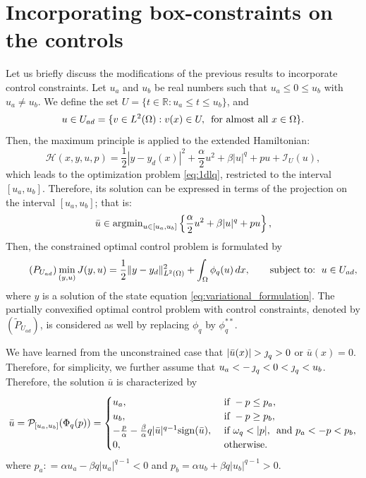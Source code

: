 	
\section{Incorporating box-constraints on the controls}
Let us briefly discuss the modifications of the previous results to incorporate control constraints. Let \(u_a\) and \(u_b\) be real numbers such that \(u_a \leq 0 \leq u_b\) with \(u_a \ne u_b\). We define the set \(U = \{t \in \mathbb{R} : u_a \leq t \leq u_b\}\),  and  
\begin{equation}\label{eq:Uad} 
	 u \in U_{ad}= \{ v \in L^2(\Omega): v(x) \in U, \, \text{ for almost all }x\in \Omega \}. 
\end{equation}
Then, the maximum principle is applied to the extended Hamiltonian:
\begin{equation} 
\mathcal H(x,y,u,p)= \frac{1}{2}|y-y_d(x)|^2 + \frac{\alpha}{2}u^2 + \beta |u|^q + pu + \mathcal{I}_{U}(u),	\nonumber
\end{equation}
which leads to the optimization	problem \eqref{eq:1dlq}, restricted to the interval $[u_a,u_b]$. Therefore, its solution can be expressed in terms of the projection on the interval $[u_a,u_b]$; that is:
\begin{equation}\label{eq:1dlqc}
		\bar u \displaystyle\in  \operatorname{argmin}_{u\in [u_a,u_b]} \left\{ \frac{\alpha}{2}u^2+\beta |u|^q + pu \right\},
	\end{equation}
Then, the constrained optimal control problem is formulated by
\begin{equation}
		\tag{$ P_{U_{ad}}$} \label{eq:OCP_c}
			\displaystyle\min_{(y,u)} J(y,u) = \frac12 \norm{y-y_d}^2_{L^2(\om)} + \int_\om \phi_q(u) \, dx, \qquad \text{subject to: } \, u\in U_{ad},
\end{equation}
where $y$ is a solution of the state equation \eqref{eq:variational_formulation}. The partially 
convexified optimal control problem with control constraints, denoted by 
$(\tilde P_{U_{ad}})$, is considered as well by replacing $\phi_q$ by $\phi_q^{**}$.



We have learned from the unconstrained case that $|\bar u(x)|>\jump_q>0$ or $\bar u (x)=0$. Therefore, for simplicity, we further assume that $u_a < - \operatorname{\jmath}_q<0<\operatorname{\jmath}_q<u_b$. Therefore, the solution $\bar u $ is characterized by 
\begin{equation}\label{eq:Phi2_c}
	\bar u=		\mathcal{P}_{[u_a,u_b]}(\Phi_q (p)) =	
			\begin{cases}
			u_a, &  \text{ if } -p\leq  p_a, \\
			u_b, &  \text{ if } -p\geq  p_b, \\
				-\frac{p}{\alpha}-\frac{\beta}{\alpha} q |\bar u|^{q-1}\sign (\bar u), & \text{ if } \omega_q<|p|,\,  \text{ and } p_a<-p<p_b  , \\
				0,                         &	\text{ otherwise.}
			\end{cases}
\end{equation}
where $p_a : = \alpha u_a -  \beta q  |u_a|^{q-1}<0$	 and $p_b= \alpha u_b +  \beta q  |u_b|^{q-1}>0$. 

